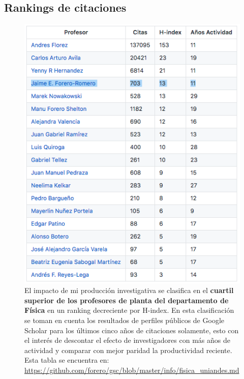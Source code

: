 \documentclass{article}
\begin{document}
\subsection{Rankings de citaciones}
\begin{figure}[!h]
\begin{center}
\includegraphics[scale=0.6]{scholar_fisica.png}
\caption{
El impacto de mi producci\'on investigativa se clasifica en el {\bf cuartil
  superior de los profesores de planta del departamento de F\'isica} en
  un ranking decreciente por H-index. 
  En esta clasificaci\'on se toman en cuenta los resultados de
  perfiles p\'ublicos de Google Scholar
  para los \'ultimos cinco a\~nos de citaciones solamente, esto con el
  inter\'es de descontar el efecto de investigadores con m\'as a\~nos de
  actividad y comparar con mejor paridad la productividad
  reciente. Esta tabla se encuentra en: \url{https://github.com/forero/gsc/blob/master/info/fisica_uniandes.md}\label{table:fisica}}
\end{center}
\end{figure}

\newpage
\end{document}
